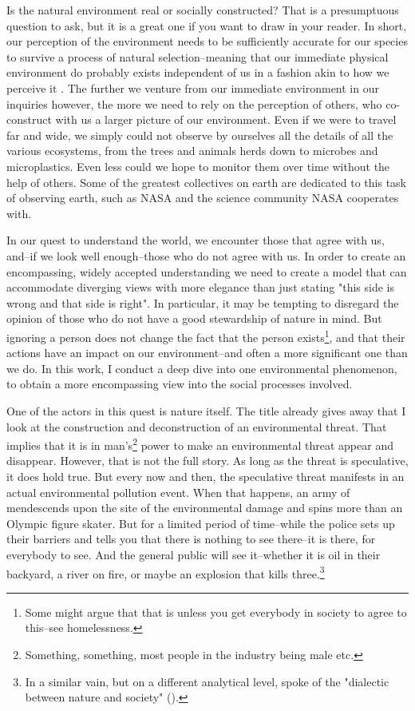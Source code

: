
Is the natural environment real or socially constructed? That is a presumptuous question to ask, but it is a great one if you want to draw in your reader. In short, our perception of the environment needs to be sufficiently accurate for our species to survive a process of natural selection--meaning that our immediate physical environment do probably exists independent of us in a fashion akin to how we perceive it \citep{Hoffman2015a}. The further we venture from our immediate environment in our inquiries however, the more we need to rely on the perception of others, who co-construct with us a larger picture of our environment. Even if we were to travel far and wide, we simply could not observe by ourselves all the details of all the various ecosystems, from the trees and animals herds down to microbes and microplastics. Even less could we hope to monitor them over time without the help of others. Some of the greatest collectives on earth are dedicated to this task of observing earth, such as NASA and the science community NASA cooperates with.

In our quest to understand the world, we encounter those that agree with us, and--if we look well enough--those who do not agree with us. In order to create an encompassing, widely accepted understanding we need to create a model that can accommodate diverging views with more elegance than just stating "this side is wrong and that side is right". In particular, it may be tempting to disregard the opinion of those who do not have a good stewardship of nature in mind. But ignoring a person does not change the fact that the person exists\footnote{Some might argue that that is unless you get everybody in society to agree to this--see homelessness.}, and that their actions have an impact on our environment--and often a more significant one than we do. In this work, I conduct a deep dive into one environmental phenomenon, to obtain a more encompassing view into the social processes involved.

One of the actors in this quest is nature itself. The title already gives away that I look at the construction and deconstruction of an environmental threat. That implies that it is in man's\footnote{\label{note1}Something, something, most people in the industry being male etc.} power to make an environmental threat appear and disappear. However, that is not the full story. As long as the threat is speculative, it does hold true. But every now and then, the speculative threat manifests in an actual environmental pollution event. When that happens, an army of men\footnotemark[\ref{note1}] descends upon the site of the environmental damage and spins more than an Olympic figure skater. But for a limited period of time--while the police sets up their barriers and tells you that there is nothing to see there--it is there, for everybody to see. And the general public will see it--whether it is oil in their backyard, a river on fire, or maybe an explosion that kills three.\footnote{In a similar vain, but on a different analytical level, \citeauthor{Berger1966} spoke of the "dialectic between nature and society" (\citeyear[p. 201]{Berger1966}).}

